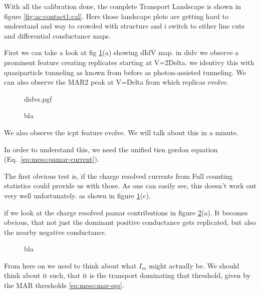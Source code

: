         With all the calibration done, the complete Transport Landscape is shown in figure \ref{fig:ac:contact1:cal}. Here those landscape plots are getting hard to understand and way to crowded with structure and i switch to either line cuts and differential conductance maps.

        First we can take a look at fig \ref{fig:ac:contact1:sim-img}(a) showing dIdV map. in didv we observe a prominent feature creating replicates starting at V=2Delta. we identivy this with quasiparticle tunneling as known from before as photon-assisted tunneling. We can also observe the MAR2 peak at V=Delta from which replicas evolve.


        \begin{figure}
            \centering
            {didvs.pgf}
            \caption{
                bla
            }
            \label{fig:ac:contact1:sim-img}
        \end{figure}


        We also observe the icpt feature evolve. We will talk about this in a minute.

        In order to understand this, we need the unified tien gordon equation (Eq.~\ref{eq:meso:pamar-current}).

        The first obvious test is, if the charge resolved currents from Full counting statistics could provide us with those. As one can easily see, this doesn't work out very well unfortunately. as shown in figure \ref{fig:ac:contact1:sim-img}(c).

        if we look at the charge resolved pamar contributions in figure \ref{fig:ac:contact1:pamarm}(a). It becomes obvious, that not just the dominant positive conductance gets replicated, but also the nearby negative conductance.
        
        \begin{figure}[t]
            \centering
            \caption{
                bla
            }
            \label{fig:ac:contact1:pamarm}
        \end{figure}

        From here on we need to think about what $I_m$ might actually be. We should think about it such, that it is the transport dominating that threshold, given by the MAR thresholds \eqref{eq:meso:mar-sgs}.

